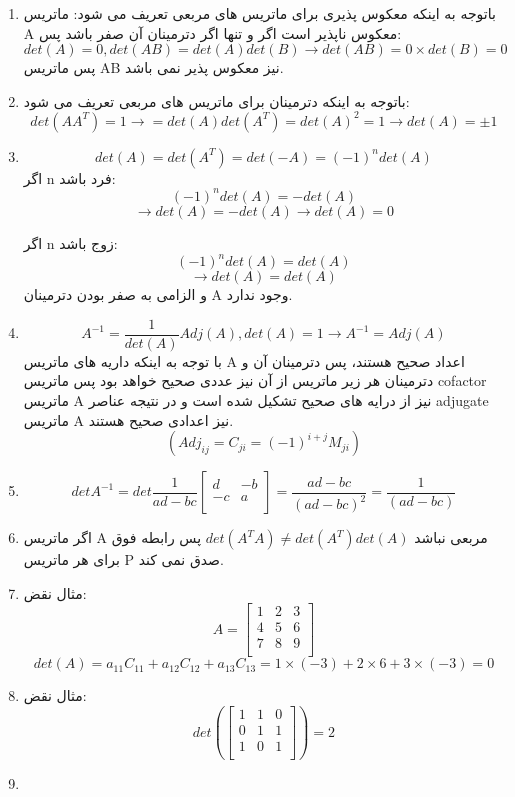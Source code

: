 \documentclass{article}
\begin{document}
\begin{enumerate}[label=\alph*)]
	\item 
	باتوجه به اینکه معکوس پذیری برای ماتریس های مربعی تعریف می شود:
	ماتریس A معکوس ناپذیر است اگر و تنها اگر دترمینان آن صفر باشد پس:
	$$ det(A) = 0 , det(AB) = det(A) det(B) \rightarrow det(AB)= 0 \times det(B) = 0 $$
	پس ماتریس AB نیز معکوس پذیر نمی باشد.
	
	\item 
	باتوجه به اینکه دترمینان برای ماتریس های مربعی تعریف می شود:
	$$ det(AA^T) = 1 \rightarrow =det(A) det(A^T) = det(A)^2 = 1 \rightarrow det(A) = \pm 1$$
	
	\item 
	
	$$det(A) = det(A^T) = det (-A)= (-1)^ndet(A)$$
	اگر n فرد باشد:
	$$(-1)^ndet(A) = -det(A)$$
	$$ \rightarrow det(A) = -det(A) \rightarrow det(A) = 0$$
	
	اگر n زوج باشد:
	$$(-1)^ndet(A) = det(A)$$
	$$ \rightarrow det(A) = det(A)$$
	و الزامی به صفر بودن دترمینان A وجود ندارد.
	\item
	$$A^{-1} = \frac{1}{det(A)}Adj(A), det(A) = 1 \rightarrow A^{-1}=Adj(A) $$
	با توجه به اینکه داریه های ماتریس A اعداد صحیح هستند، پس دترمینان آن و دترمینان هر زیر ماتریس از آن نیز عددی صحیح خواهد بود پس ماتریس cofactor  ماتریس A نیز از درایه های صحیح تشکیل شده است و در نتیجه عناصر adjugate ماتریس A نیز اعدادی صحیح هستند.
	$$(Adj_{ij} = C_{ji} = (-1)^{i+j}M_{ji})$$
	
	\item 
	$$det A^{-1} = det \frac {1}{ad-bc} 
	\begin{bmatrix}
	d & -b \\
	-c &  a\\
	\end{bmatrix} = \frac{ad-bc}{(ad-bc)^2} =\frac{1}{(ad-bc)} $$
	
	\item 
	اگر ماتریس A مربعی نباشد 
	$det(A^TA) \ne det(A^T) det(A)$ 
	پس رابطه فوق برای هر ماتریس P صدق نمی کند.
	\item 
	مثال نقض:
	$$
	A = \begin{bmatrix}
	1 & 2& 3 \\
	4 & 5& 6 \\
	7 & 8& 9 \\
	\end{bmatrix}
	$$
	$$det(A) = a_{11}C_{11}+a_{12}C_{12}+a_{13}C_{13} = 1 \times (-3) + 2 \times 6  + 3 \times (-3) = 0$$ 
	\item
	مثال نقض:
	$$det(
	\begin{bmatrix}
	1 & 1& 0 \\
	0 & 1& 1 \\
	1 & 0& 1 \\
	\end{bmatrix}) = 2
	$$
	\item 
	

\end{enumerate}
\end{document}
